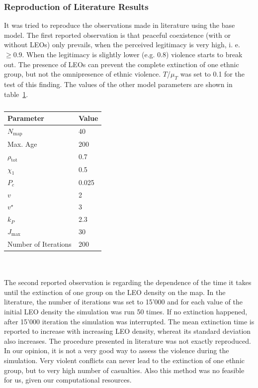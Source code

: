 \documentclass[11pt]{article}
\begin{document}
\subsubsection{Reproduction of Literature Results}
It was tried to reproduce the observations made in literature using the base model. The first reported observation is that peaceful coexistence (with or without LEOs) only prevails, when the perceived legitimacy is very high, i. e. $\geq 0.9$. When the legitimacy is slightly lower (e.g. 0.8) violence starts to break out. The presence of LEOs can prevent the complete extinction of one ethnic group, but not the omnipresence of ethnic violence. $T$/$\mu_T$ was set to 0.1 for the test of this finding. The values of the other model parameters are shown in table~\ref{tab:values_parameters}.
\begin{table}[!htbp]
	\centering
	\caption{}
	\vspace{0.5 cm}
		\begin{tabular}{l | l}
		Parameter & Value\\
		\hline
		$N_{\text{map}}$ & 40\\
		Max. Age & 200\\
		$\rho_{\text{tot}}$ & 0.7\\
		$\chi_1$ & 0.5\\
		$P_c$ & 0.025\\
		$v$ & 2\\
		$v^\star$ & 3\\
		$k_P$ & 2.3\\
		$J_{\text{max}}$ & 30\\
		Number of Iterations & 200\\
	\end{tabular}
	\label{tab:values_parameters}
\end{table}
\\
\\
The second reported observation is regarding the dependence of the time it takes until the extinction of one group on the LEO density on the map. In the literature, the number of iterations was set to 15'000 and for each value of the initial LEO density the simulation was run 50 times. If no extinction happened, after 15'000 iteration the simulation was interrupted. The mean extinction time is reported to increase with increasing LEO density, whereat its standard deviation also increases. The procedure presented in literature was not exactly reproduced. In our opinion, it is not a very good way to assess the violence during the simulation. Very violent conflicts can never lead to the extinction of one ethnic group, but to very high number of casualties. Also this method was no feasible for us, given our computational resources.\\
\end{document}
